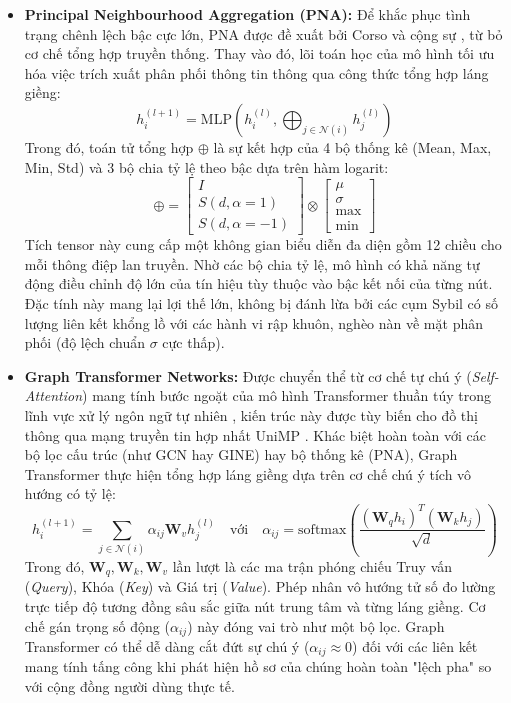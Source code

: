 \begin{itemize}[label={--}, itemsep=5pt]
    \item \textbf{Principal Neighbourhood Aggregation (PNA):} Để khắc phục tình trạng chênh lệch bậc cực lớn, PNA được đề xuất bởi Corso và cộng sự \cite{corso2020principal}, từ bỏ cơ chế tổng hợp truyền thống. Thay vào đó, lõi toán học của mô hình tối ưu hóa việc trích xuất phân phối thông tin thông qua công thức tổng hợp láng giềng:
    $$
        h_i^{(l+1)} = \text{MLP} \left( h_i^{(l)}, \bigoplus_{j \in \mathcal{N}(i)} h_j^{(l)} \right)
    $$
    Trong đó, toán tử tổng hợp $\oplus$ là sự kết hợp của 4 bộ thống kê (Mean, Max, Min, Std) và 3 bộ chia tỷ lệ theo bậc dựa trên hàm logarit:
    $$
        \oplus = \begin{bmatrix} I \\ S(d, \alpha=1) \\ S(d, \alpha=-1) \end{bmatrix} \otimes \begin{bmatrix} \mu \\ \sigma \\ \max \\ \min \end{bmatrix}
    $$
    Tích tensor này cung cấp một không gian biểu diễn đa diện gồm 12 chiều cho mỗi thông điệp lan truyền. Nhờ các bộ chia tỷ lệ, mô hình có khả năng tự động điều chỉnh độ lớn của tín hiệu tùy thuộc vào bậc kết nối của từng nút. Đặc tính này mang lại lợi thế lớn, không bị đánh lừa bởi các cụm Sybil có số lượng liên kết khổng lồ với các hành vi rập khuôn, nghèo nàn về mặt phân phối (độ lệch chuẩn $\sigma$ cực thấp).
    
    \item \textbf{Graph Transformer Networks:} Được chuyển thể từ cơ chế tự chú ý (\textit{Self-Attention}) mang tính bước ngoặt của mô hình Transformer thuần túy trong lĩnh vực xử lý ngôn ngữ tự nhiên \cite{vaswani2017attention}, kiến trúc này được tùy biến cho đồ thị thông qua mạng truyền tin hợp nhất UniMP \cite{shi2020masked}. Khác biệt hoàn toàn với các bộ lọc cấu trúc (như GCN hay GINE) hay bộ thống kê (PNA), Graph Transformer thực hiện tổng hợp láng giềng dựa trên cơ chế chú ý tích vô hướng có tỷ lệ:
    \[
        h_i^{(l+1)} = \sum_{j \in \mathcal{N}(i)} \alpha_{ij} \mathbf{W}_v h_j^{(l)} \quad \text{với} \quad \alpha_{ij} = \text{softmax} \left( \frac{(\mathbf{W}_q h_i)^T (\mathbf{W}_k h_j)}{\sqrt{d}} \right)
    \]
    Trong đó, $\mathbf{W}_q, \mathbf{W}_k, \mathbf{W}_v$ lần lượt là các ma trận phóng chiếu Truy vấn (\textit{Query}), Khóa (\textit{Key}) và Giá trị (\textit{Value}). Phép nhân vô hướng tử số đo lường trực tiếp độ tương đồng sâu sắc giữa nút trung tâm và từng láng giềng. Cơ chế gán trọng số động ($\alpha_{ij}$) này đóng vai trò như một bộ lọc. Graph Transformer có thể dễ dàng cắt đứt sự chú ý ($\alpha_{ij} \approx 0$) đối với các liên kết mang tính tấng công khi phát hiện hồ sơ của chúng hoàn toàn "lệch pha" so với cộng đồng người dùng thực tế.
\end{itemize}
\vspace{0.3cm}

